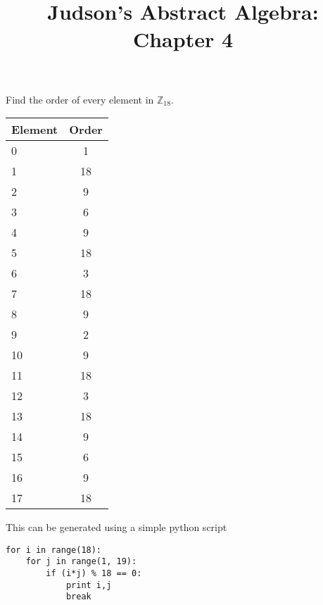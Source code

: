 \documentclass[a4paper]{article}
\title{Judson's Abstract Algebra: Chapter 4}
\date{}
\begin{document}
\maketitle

\section{}

\section{}

\section{}

\section{}


\section{}

Find the order of every element in $\mathbb{Z}_{18}$.

\begin{tabular}{ l | c }
  Element & Order \\
  \hline
  0 & 1 \\
  1 & 18 \\
  2 & 9 \\
  3 & 6 \\
  4 & 9 \\
  5 & 18 \\
  6 & 3 \\
  7 & 18 \\
  8 & 9 \\
  9 & 2 \\
  10 & 9 \\
  11 & 18 \\
  12 & 3 \\
  13 & 18 \\
  14 & 9 \\
  15 & 6 \\
  16 & 9 \\
  17 & 18 \\
\end{tabular}

This can be generated using a simple python script

\begin{verbatim}
for i in range(18):
    for j in range(1, 19):
        if (i*j) % 18 == 0:
            print i,j
            break
\end{verbatim}
\end{document}
